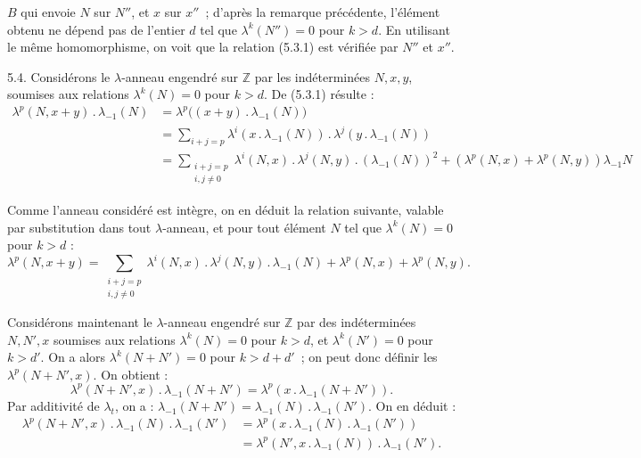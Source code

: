 
\(B\) qui
envoie \(N\) sur \(N''\), et \(x\) sur \(x''\)~; d'après la remarque précédente, l'élément obtenu ne dépend pas de l'entier \(d\) tel que \(\lambda^k(N'')=0\) pour \(k>d\). En utilisant le même homomorphisme, on voit que la relation (5.3.1) est vérifiée par \(N''\) et \(x''\).

5.4. Considérons le \(\lambda\)-anneau engendré sur \(\mathbb Z\) par les indéterminées \(N,x,y\), soumises aux relations \(\lambda^k(N)=0\) pour \(k>d\). De (5.3.1) résulte :
\begin{align*}
  \lambda^p(N,x+y)\mathbin{.}\lambda_{-1}(N)
  &=\lambda^p\bigl((x+y)\mathbin{.}\lambda_{-1}(N)\bigr)\\
  &=\sum_{i+j=p}\lambda^i(x\mathbin{.}\lambda_{-1}(N))\mathbin{.}\lambda^j(y\mathbin{.}\lambda_{-1}(N))\\
  &=\sum_{\substack{i+j=p\\ i,j\ne0}}\lambda^i(N,x)\mathbin{.}\lambda^j(N,y)\mathbin{.}(\lambda_{-1}(N))^2
    +(\lambda^p(N,x)+\lambda^p(N,y))\lambda_{-1}N
\end{align*}

Comme l'anneau considéré est intègre, on en déduit la relation suivante, valable par substitution dans tout \(\lambda\)-anneau, et pour tout élément \(N\) tel que \(\lambda^k(N)=0\) pour \(k>d\) :
\begin{equation}\tag{5.4.1}
  \lambda^p(N,x+y)=\sum_{\substack{i+j=p\\ i,j\ne0}}\lambda^i(N,x)\mathbin{.}\lambda^j(N,y)\mathbin{.}\lambda_{-1}(N)+\lambda^p(N,x)+\lambda^p(N,y).
\end{equation}

Considérons maintenant le \(\lambda\)-anneau engendré sur \(\mathbb Z\) par des indéterminées \(N,N',x\) soumises aux relations \(\lambda^k(N)=0\) pour \(k>d\), et \(\lambda^k(N')=0\) pour \(k>d'\). On a alors \(\lambda^k(N+N')=0\) pour \(k>d+d'\)~; on peut donc définir les \(\lambda^p(N+N',x)\). On obtient :
\[
  \lambda^p(N+N',x)\mathbin{.}\lambda_{-1}(N+N')=\lambda^p(x\mathbin{.}\lambda_{-1}(N+N')).
\]
Par additivité de \(\lambda_t\), on a : \(\lambda_{-1}(N+N')=\lambda_{-1}(N)\mathbin{.}\lambda_{-1}(N')\). On en déduit :
\begin{align*}
  \lambda^p(N+N',x)\mathbin{.}\lambda_{-1}(N)\mathbin{.}\lambda_{-1}(N')
  &=\lambda^p(x\mathbin{.}\lambda_{-1}(N)\mathbin{.}\lambda_{-1}(N'))\\
  &=\lambda^p(N',x\mathbin{.}\lambda_{-1}(N))\mathbin{.}\lambda_{-1}(N').
\end{align*}
